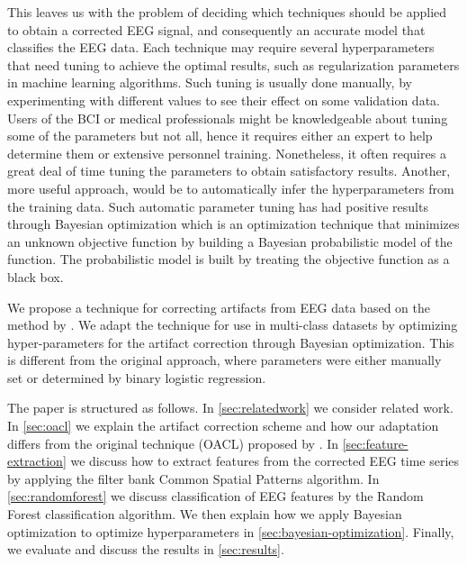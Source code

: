 This leaves us with the problem of deciding which techniques should be applied to obtain a corrected EEG signal, and consequently an accurate model that classifies the EEG data. Each technique may require several hyperparameters that need tuning to achieve the optimal results, such as regularization parameters in machine learning algorithms. Such tuning is usually done manually, by experimenting with different values to see their effect on some validation data. Users of the BCI or medical professionals might be knowledgeable about tuning some of the parameters but not all, hence it requires either an expert to help determine them or extensive personnel training. Nonetheless, it often requires a great deal of time tuning the parameters to obtain satisfactory results. Another, more useful approach, would be to automatically infer the hyperparameters from the training data. Such automatic parameter tuning has had positive results through Bayesian optimization \citep{brochu2010tutorial,snoek2012practical,shahriari2016taking} which is an optimization technique that minimizes an unknown objective function by building a Bayesian probabilistic model of the function. The probabilistic model is built by treating the objective function as a black box.

We propose a technique for correcting artifacts from EEG data based on the method by \citep{li2015ocular}. We adapt the technique for use in multi-class datasets by optimizing hyper-parameters for the artifact correction through Bayesian optimization. This is different from the original approach, where parameters were either manually set or determined by binary logistic regression.

The paper is structured as follows. In \cref{sec:relatedwork} we consider related work. In \cref{sec:oacl} we explain the artifact correction scheme and how our adaptation differs from the original technique (OACL) proposed by \citet{li2015ocular}. In \cref{sec:feature-extraction} we discuss how to extract features from the corrected EEG time series by applying the filter bank Common Spatial Patterns algorithm. In \cref{sec:randomforest} we discuss classification of EEG features by the Random Forest classification algorithm. We then explain how we apply Bayesian optimization to optimize hyperparameters in \cref{sec:bayesian-optimization}. Finally, we evaluate and discuss the results in \cref{sec:results}.


